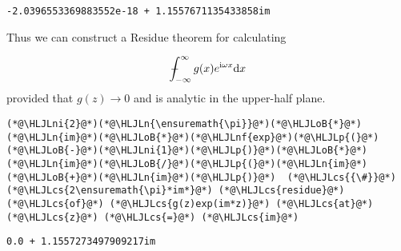 \documentclass[12pt,landscape]{article}
\newcommand{\HLJLn}[1]{#1}
\newcommand{\HLJLnf}[1]{\textcolor[RGB]{66,102,213}{#1}}
\newcommand{\HLJLni}[1]{\textcolor[RGB]{59,151,46}{#1}}
\newcommand{\HLJLoB}[1]{\textcolor[RGB]{102,102,102}{\textbf{#1}}}
\newcommand{\HLJLp}[1]{#1}
\newcommand{\HLJLcs}[1]{\textcolor[RGB]{153,153,119}{\textit{#1}}}
\def\D{ {\rm d} }
\def\I{ {\rm i} }
\def\Xint#1{ \mathchoice
   {\XXint\displaystyle\textstyle{#1} }%
   {\XXint\textstyle\scriptstyle{#1} }%
   {\XXint\scriptstyle\scriptscriptstyle{#1} }%
   {\XXint\scriptscriptstyle\scriptscriptstyle{#1} }%
   \!\int}
\def\XXint#1#2#3{ {\setbox0=\hbox{$#1{#2#3}{\int}$}
     \vcenter{\hbox{$#2#3$}}\kern-.5\wd0} }
\def\dashint{\Xint-}
\def\infdashint{\dashint_{-\infty}^\infty}
\def\dx{\D x}
\begin{document}
{\begin{lstlisting}
-2.0396553369883552e-18 + 1.1557671135433858im
\end{lstlisting}


Thus we can construct a Residue theorem for calculating

\[
\infdashint g(x) e^{\I \omega x} \dx
\]
provided that $g(z) \rightarrow 0$ and is analytic in the upper-half plane.


\begin{lstlisting}
(*@\HLJLni{2}@*)(*@\HLJLn{\ensuremath{\pi}}@*)(*@\HLJLoB{*}@*)(*@\HLJLn{im}@*)(*@\HLJLoB{*}@*)(*@\HLJLnf{exp}@*)(*@\HLJLp{(}@*)(*@\HLJLoB{-}@*)(*@\HLJLni{1}@*)(*@\HLJLp{)}@*)(*@\HLJLoB{*}@*)(*@\HLJLn{im}@*)(*@\HLJLoB{/}@*)(*@\HLJLp{(}@*)(*@\HLJLn{im}@*)(*@\HLJLoB{+}@*)(*@\HLJLn{im}@*)(*@\HLJLp{)}@*)  (*@\HLJLcs{{\#}}@*) (*@\HLJLcs{2\ensuremath{\pi}*im*}@*) (*@\HLJLcs{residue}@*) (*@\HLJLcs{of}@*) (*@\HLJLcs{g(z)exp(im*z)}@*) (*@\HLJLcs{at}@*) (*@\HLJLcs{z}@*) (*@\HLJLcs{=}@*) (*@\HLJLcs{im}@*)
\end{lstlisting}

\begin{lstlisting}
0.0 + 1.1557273497909217im
\end{lstlisting}


}
\end{document}
